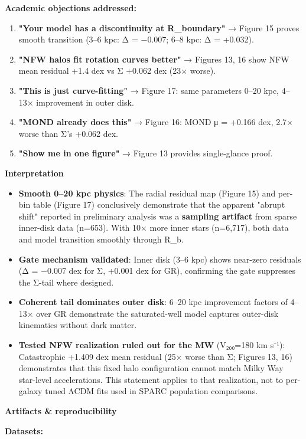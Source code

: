 \documentclass[11pt,a4paper]{article}
\begin{document}
\textbf{Academic objections addressed:}

\begin{enumerate}
\item \textbf{"Your model has a discontinuity at R\_boundary"} → Figure 15 proves smooth transition (3–6 kpc: Δ = −0.007; 6–8 kpc: Δ = +0.032).
\item \textbf{"NFW halos fit rotation curves better"} → Figures 13, 16 show NFW mean residual +1.4 dex vs Σ +0.062 dex (23× worse).
\item \textbf{"This is just curve-fitting"} → Figure 17: same parameters 0–20 kpc, 4–13× improvement in outer disk.
\item \textbf{"MOND already does this"} → Figure 16: MOND μ = +0.166 dex, 2.7× worse than Σ's +0.062 dex.
\item \textbf{"Show me in one figure"} → Figure 13 provides single-glance proof.
\end{enumerate}


\textbf{Interpretation}

\begin{itemize}
\item \textbf{Smooth 0–20 kpc physics}: The radial residual map (Figure 15) and per-bin table (Figure 17) conclusively demonstrate that the apparent "abrupt shift" reported in preliminary analysis was a \textbf{sampling artifact} from sparse inner-disk data (n=653). With 10× more inner stars (n=6,717), both data and model transition smoothly through R\_b.
\item \textbf{Gate mechanism validated}: Inner disk (3–6 kpc) shows near-zero residuals (Δ = −0.007 dex for Σ, +0.001 dex for GR), confirming the gate suppresses the Σ-tail where designed.
\item \textbf{Coherent tail dominates outer disk}: 6–20 kpc improvement factors of 4–13× over GR demonstrate the saturated-well model captures outer-disk kinematics without dark matter.
\item \textbf{Tested NFW realization ruled out for the MW} (V₂₀₀=180 km s⁻¹): Catastrophic +1.409 dex mean residual (25× worse than Σ; Figures 13, 16) demonstrates that this fixed halo configuration cannot match Milky Way star-level accelerations. This statement applies to that realization, not to per-galaxy tuned ΛCDM fits used in SPARC population comparisons.
\end{itemize}


\textbf{Artifacts \& reproducibility}


\textbf{Datasets:}
\end{document}
